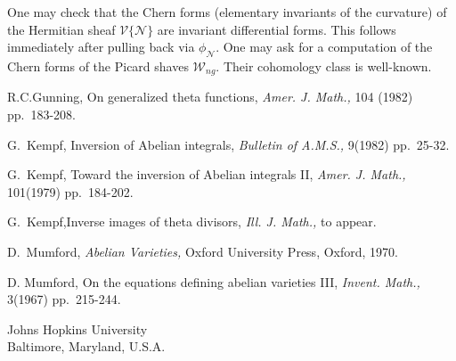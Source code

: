 \begin{remark*}
One may check that the Chern forms (elementary invariants of the
curvature) of the Hermitian sheaf $\mathscr{V}\{\mathscr{N}\}$ are
invariant differential forms. This follows immediately after pulling
back via $\phi_{\mathscr{N}}$. One may ask for a computation of the
Chern forms of the Picard shaves $\mathscr{W}_{ng}$. Their cohomology
class is well-known. 
\end{remark*}

\begin{thebibliography}{}
 R.C.Gunning, On generalized theta functions, {\em Amer. J. Math.,} 104 (1982) pp.~183-208.

 G.~Kempf, Inversion of Abelian integrals, {\em Bulletin of A.M.S.,} 9(1982) pp.~25-32.

 G.~Kempf, Toward the inversion of Abelian integrals II, {\em Amer. J. Math.,} 101(1979) pp.~184-202.

 G.~Kempf,\pageoriginale Inverse images of theta divisors, {\em Ill. J. Math.,} to appear.

 D.~Mumford, {\em Abelian Varieties,} Oxford University Press, Oxford, 1970.

 D. Mumford, On the equations defining abelian varieties III, {\em Invent. Math.,} 3(1967) pp.~215-244.
\end{thebibliography}

\vskip 1cm

\noindent
Johns Hopkins University\\
Baltimore, Maryland, U.S.A.


